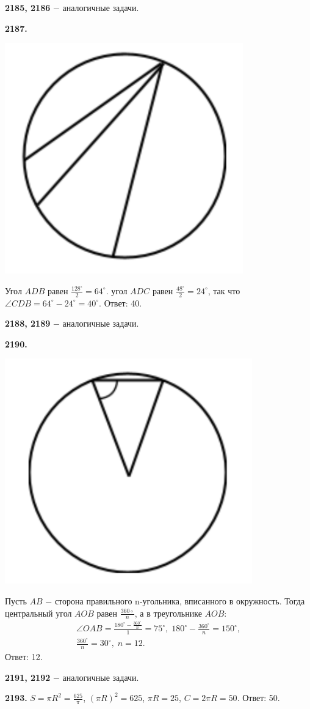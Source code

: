 \textbf{2185, 2186} $-$ аналогичные задачи.

\textbf{2187.}

{\centering \includegraphics[width=0.35\linewidth]{Geometry/Content/49.png}
	
}

 Угол $ADB$ равен $\frac{128^\circ}{2}=64^\circ$. угол $ADC$ равен $\frac{48^\circ}{2}=24^\circ$, так что $\angle CDB = 64^\circ - 24^\circ=40^\circ.$ \newline \null \hspace*{\fill} Ответ: 40.

\textbf{2188, 2189} $-$ аналогичные задачи.

\textbf{2190.}

{\centering \includegraphics[width=0.35\linewidth]{Geometry/Content/50.png}
	
}

Пусть $AB$ $-$ сторона правильного n-угольника, вписанного в \newline окружность. Тогда центральный угол $AOB$ равен $\frac{360\circ}{n}$, а в треугольнике $AOB$:
\begin{gather*}
	\angle OAB = \frac{180^\circ-\frac{360^\circ}{n}}{1}=75^\circ, \; 180^\circ-\frac{360^\circ}{n}=150^\circ, \\ \frac{360^\circ}{n}=30^\circ,\;  n =12.
\end{gather*} \null \hspace*{\fill} Ответ: 12.

\textbf{2191, 2192} $-$ аналогичные задачи.

\textbf{2193.} $S=\pi R^2= \frac{625}{\pi}$, $(\pi R)^2 = 625$, $\pi R = 25$, $C = 2\pi R = 50.$ \newline \null \hspace*{\fill} Ответ: 50.


